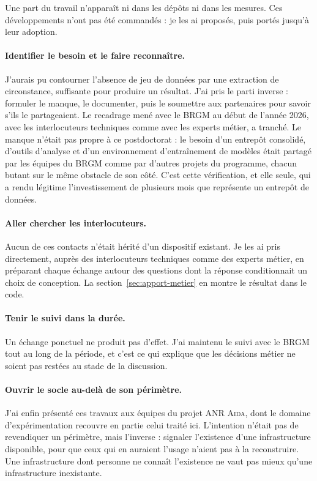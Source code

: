 Une part du travail n'apparaît ni dans les dépôts ni dans les mesures. Ces développements
n'ont pas été commandés : je les ai proposés, puis portés jusqu'à leur adoption.

\paragraph{Identifier le besoin et le faire reconnaître.} J'aurais pu contourner l'absence de jeu
de données par une extraction de circonstance, suffisante pour produire un résultat. J'ai pris le
parti inverse : formuler le manque, le documenter, puis le soumettre aux partenaires pour savoir
s'ils le partageaient. Le recadrage mené avec le BRGM au début de l'année 2026, avec les
interlocuteurs techniques comme avec les experts métier, a tranché. Le manque n'était pas propre
à ce postdoctorat : le besoin d'un entrepôt consolidé, d'outils d'analyse et d'un environnement
d'entraînement de modèles était partagé par les équipes du BRGM comme par d'autres projets du
programme, chacun butant sur le même obstacle de son côté. C'est cette vérification, et elle
seule, qui a rendu légitime l'investissement de plusieurs mois que représente un entrepôt de
données.

\paragraph{Aller chercher les interlocuteurs.} Aucun de ces contacts n'était hérité d'un
dispositif existant. Je les ai pris directement, auprès des interlocuteurs techniques comme des
experts métier, en préparant chaque échange autour des questions dont la réponse conditionnait un
choix de conception. La section~\ref{sec:apport-metier} en montre le résultat dans le code.

\paragraph{Tenir le suivi dans la durée.} Un échange ponctuel ne produit pas d'effet. J'ai
maintenu le suivi avec le BRGM tout au long de la période, et c'est ce qui explique que les
décisions métier ne soient pas restées au stade de la discussion.

\paragraph{Ouvrir le socle au-delà de son périmètre.} J'ai enfin présenté ces travaux aux équipes
du projet ANR \textsc{Aida}, dont le domaine d'expérimentation recouvre en partie celui traité
ici. L'intention n'était pas de revendiquer un périmètre, mais l'inverse : signaler l'existence
d'une infrastructure disponible, pour que ceux qui en auraient l'usage n'aient pas à la
reconstruire. Une infrastructure dont personne ne connaît l'existence ne vaut pas mieux qu'une
infrastructure inexistante.

